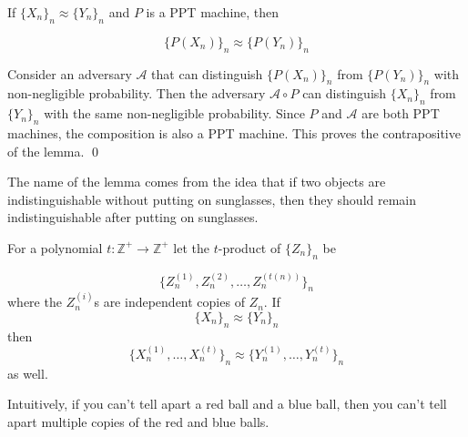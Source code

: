 \documentclass[12pt]{tufte-book}
\newcommand{\ma}{\mathcal{A}}
\begin{document}
\begin{lemma}
If $\{X_n\}_n\approx\{Y_n\}_n$ and $P$ is a PPT machine, then

$$\{P(X_n)\}_n\approx \{P(Y_n)\}_n$$
\end{lemma}

\proof
Consider an adversary $\ma$ that can distinguish $\{P(X_n)\}_n$ from $\{P(Y_n)\}_n$ with non-negligible probability. Then the adversary $\ma\circ P$ can distinguish $\{X_n\}_n$ from $\{Y_n\}_n$ with the same non-negligible probability. Since $P$ and $\ma$ are both PPT machines, the composition is also a PPT machine. This proves the contrapositive of the lemma.
\qed

The name of the lemma comes from the idea that if two objects are indistinguishable without putting on sunglasses, then they should remain indistinguishable after putting on sunglasses.

\begin{lemma}
For a polynomial $t:\mathbb{Z}^+\rightarrow\mathbb{Z}^+$ let the $t$-product of $\{Z_n\}_n$ be

$$\{Z_n^{(1)}, Z_n^{(2)},\hdots, Z_n^{(t(n))}\}_n$$
where the $Z_n^{(i)}$s are independent copies of $Z_n$. If
$$\{X_n\}_n\approx\{Y_n\}_n$$
then
$$\{X_n^{(1)},\hdots,X_n^{(t)}\}_n\approx\{Y_n^{(1)},\hdots,Y_n^{(t)}\}_n$$
as well.
\end{lemma}
Intuitively, if you can't tell apart a red ball and a blue ball, then you can't tell apart multiple copies of the red and blue balls.
\end{document}
